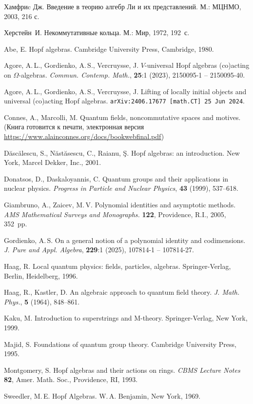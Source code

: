 \documentclass[12pt, reqno, a4paper, oneside, notitlepage]{amsart}
\makeatletter
\theoremstyle{mytheoremstyle}
\theoremstyle{myremarkstyle}
\numberwithin{equation}{section}
\renewenvironment{proof}[1][\proofname]{\par\indent {\bfseries #1\@addpunct{.} }}{\qed}
\makeatother
\begin{document}
\begin{proof}
\begin{thebibliography}{99}
  Хамфриc Дж. Введение в теорию алгебр Ли и их представлений. М.: МЦНМО, 2003, 216 с. 

 Херстейн~И. Некоммутативные кольца.
М.: Мир, 1972, 192~с.

 Abe, E. Hopf algebras. Cambridge University Press, Cambridge, 1980.

Agore, A.\,L., Gordienko, A.\,S., Vercruysse, J.
$V$-universal Hopf algebras (co)acting on $\Omega$-algebras. \textit{Commun. Contemp. Math.},
\textbf{25}:1 (2023), 2150095-1 -- 2150095-40. 

Agore, A.\,L., Gordienko, A.\,S., Vercruysse, J.
Lifting of locally initial objects and universal (co)acting Hopf algebras.
\texttt{arXiv:2406.17677 [math.CT] 25 Jun 2024}.


 Connes, A., Marcolli, M. Quantum fields, noncommutative spaces and motives. (Книга готовится к печати, электронная версия \url{https://www.alainconnes.org/docs/bookwebfinal.pdf})


 D\u asc\u alescu, S., N\u ast\u asescu, C., Raianu, \c S.
Hopf algebras: an introduction. New York, Marcel Dekker, Inc., 2001.


 Donatsos, D., Daskaloyannis, C. Quantum groups and their applications in nuclear physics. \textit{Progress in Particle and Nuclear Physics},  \textbf{43} (1999), 537--618.


      Giambruno, A., Zaicev, M.\,V.
Polynomial identities and asymptotic methods.
\textit{AMS Mathematical Surveys and Monographs.} \textbf{122},
Providence, R.I., 2005, 352~pp.


Gordienko, A.\,S.
On a general notion of a polynomial identity and codimensions.
\textit{J. Pure and Appl. Algebra}, \textbf{229}:1 (2025), 107814-1 -- 107814-27.


 Haag, R. Local quantum physics: fields, particles, algebras.
Springer-Verlag, Berlin, Heidelberg, 1996.

 
 Haag, R., Kastler, D. An algebraic approach to quantum field theory.
\textit{J. Math. Phys.}, \textbf{5} (1964), 848--861.


 Kaku, M. Introduction to superstrings and M-theory. Springer-Verlag, New York, 1999.


 Majid, S. Foundations of quantum group theory. Cambridge University Press, 1995.



 Montgomery, S. Hopf algebras and their actions on rings. \textit{CBMS Lecture Notes} \textbf{82}, Amer. Math. Soc., Providence, RI, 1993.


 Sweedler, M.\,E. Hopf Algebras. W.\,A. Benjamin, New York, 1969.


\end{thebibliography}
\end{document}
